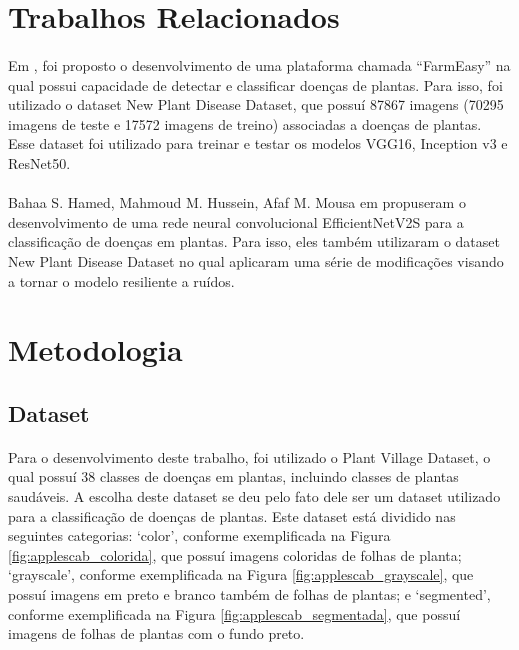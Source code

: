 \documentclass[12pt]{article}
\begin{document}
\section{Trabalhos Relacionados}

\paragraph{}Em \cite{10393095}, foi proposto o desenvolvimento de uma plataforma chamada “FarmEasy” na qual possui capacidade de detectar e classificar doenças de plantas. Para isso, foi utilizado o dataset New Plant Disease Dataset, que possuí 87867 imagens (70295 imagens de teste e 17572 imagens de treino) associadas a doenças de plantas. Esse dataset foi utilizado para treinar e testar os modelos VGG16, Inception v3 e ResNet50.

\paragraph{}Bahaa S. Hamed, Mahmoud M. Hussein, Afaf M. Mousa em \cite{article} propuseram o desenvolvimento de uma rede neural convolucional EfficientNetV2S para a classificação de doenças em plantas. Para isso, eles também utilizaram o dataset New Plant Disease Dataset no qual aplicaram uma série de modificações visando a tornar o modelo resiliente a ruídos.

\section{Metodologia}

\subsection{Dataset}

\paragraph{}Para o desenvolvimento deste trabalho, foi utilizado o Plant Village Dataset\cite{plantvillagedataset}, o qual possuí 38 classes de doenças em plantas, incluindo classes de plantas saudáveis. A escolha deste dataset se deu pelo fato dele ser um dataset utilizado para a classificação de doenças de plantas. Este dataset está dividido nas seguintes categorias: ‘color’, conforme exemplificada na Figura \ref{fig:applescab_colorida}, que possuí imagens coloridas de folhas de planta; ‘grayscale’, conforme exemplificada na Figura \ref{fig:applescab_grayscale}, que possuí imagens em preto e branco também de folhas de plantas; e ‘segmented’, conforme exemplificada na Figura \ref{fig:applescab_segmentada}, que possuí imagens de folhas de plantas com o fundo preto.
\end{document}
